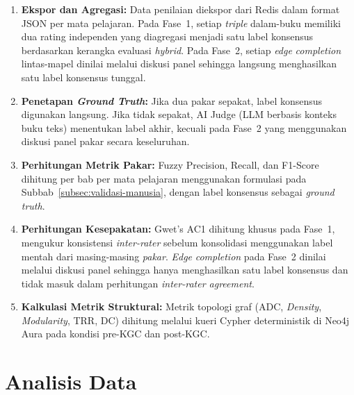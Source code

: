\documentclass[main]{subfiles}
\begin{document}
\begin{enumerate}
  \item \textbf{Ekspor dan Agregasi:} Data penilaian diekspor dari Redis
        dalam format JSON per mata pelajaran. Pada Fase~1, setiap
        \textit{triple} dalam-buku memiliki dua rating independen yang
        diagregasi menjadi satu label konsensus berdasarkan kerangka
        evaluasi \textit{hybrid}. Pada Fase~2, setiap \textit{edge}
        \textit{completion} lintas-mapel dinilai melalui diskusi panel
        sehingga langsung menghasilkan satu label konsensus tunggal.

  \item \textbf{Penetapan \textit{Ground Truth}:} Jika dua
        pakar sepakat, label konsensus digunakan langsung.
        Jika tidak sepakat, AI Judge (LLM berbasis konteks buku teks)
        menentukan label akhir, kecuali pada Fase~2 yang
        menggunakan diskusi panel pakar secara keseluruhan.

  \item \textbf{Perhitungan Metrik Pakar:} Fuzzy Precision, Recall, dan
        F1-Score dihitung per bab per mata pelajaran menggunakan
        formulasi pada Subbab~\ref{subsec:validasi-manusia}, dengan label konsensus sebagai
        \textit{ground truth}.

  \item \textbf{Perhitungan Kesepakatan:} Gwet's AC1 dihitung khusus pada
        Fase~1, mengukur konsistensi \textit{inter-rater} sebelum
        konsolidasi menggunakan label mentah dari masing-masing
        \textit{pakar}. \textit{Edge} \textit{completion} pada Fase~2
        dinilai melalui diskusi panel sehingga hanya menghasilkan satu
        label konsensus dan tidak masuk dalam perhitungan
        \textit{inter-rater agreement}.

  \item \textbf{Kalkulasi Metrik Struktural:} Metrik topologi graf
        (ADC, \textit{Density}, \textit{Modularity}, TRR, DC) dihitung
        melalui kueri Cypher deterministik di Neo4j Aura pada kondisi
        pre-KGC dan post-KGC.
\end{enumerate}

\section{Analisis Data}
\end{document}
